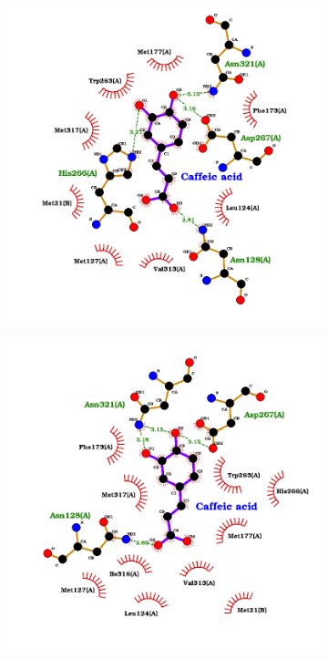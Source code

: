 \documentclass[12pt]{article}
\begin{document}
	\FloatBarrier
	\begin{figure}[h!]
		\centering
		\begin{subfigure}[h!]{0.35\textwidth}
			\hspace{2cm}
			\includegraphics[width=\textwidth]{../4/Dock/Dock2/best.png}
			\caption{}
		\end{subfigure}
		\hfill
		\begin{subfigure}[h!]{0.35\textwidth}
			\hspace{-2cm}
			\includegraphics[width=\textwidth]{../4/Dock/Dock2/best2.png}

\end{subfigure}
\end{figure}
\end{document}
